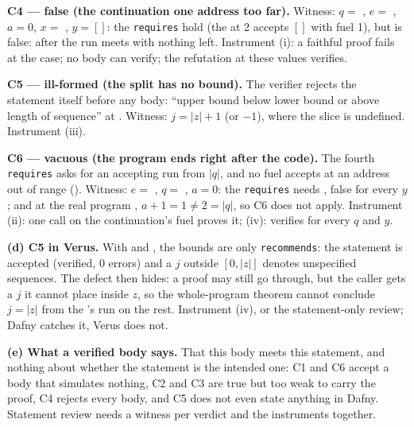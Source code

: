 \documentclass[11pt]{article}
\begin{document}
\begin{answer}
\textbf{C4 --- false (the continuation one address too far).} Witness: $q =$
, $e =$ , $a = 0$, $x =$
\dfy{['a']}, $y = []$: the \texttt{requires} hold (the  at 2
accepts $[]$ with fuel 1), but  is false: after
 the run meets  with nothing left. Instrument (i): a
faithful proof fails at the  case; no body can verify; the refutation
at these values verifies.

\textbf{C5 --- ill-formed (the split has no bound).} The verifier rejects the
statement itself before any body: ``upper bound below lower bound or above
length of sequence'' at . Witness: $j = |z| + 1$ (or $-1$), where
the slice is undefined. Instrument (iii).

\textbf{C6 --- vacuous (the program ends right after the code).} The fourth
\texttt{requires} asks for an accepting run from $|q|$, and no fuel accepts at
an address out of range (). Witness: $e =$ ,
$q =$ \dfy{[IChar('a')]}, $a = 0$: the \texttt{requires} needs
, false for every $y$; and at the real program
, $a + 1 = 1 \neq 2 = |q|$, so C6 does not apply.
Instrument (ii): one  call on the continuation's fuel proves
it; (iv):  verifies for every $q$ and $y$.

\textbf{(d) C5 in Verus.} With  and
, the bounds are only \texttt{recommends}:
the statement is accepted (verified, 0 errors) and a $j$ outside $[0, |z|]$
denotes unspecified sequences. The defect then hides: a proof may still go
through, but the caller gets a $j$ it cannot place inside $z$, so the
whole-program theorem cannot conclude $j = |z|$ from the 's run on
the rest. Instrument (iv), or the statement-only review; Dafny catches it,
Verus does not.

\textbf{(e) What a verified body says.} That this body meets this statement,
and nothing about whether the statement is the intended one: C1 and C6 accept a
body that simulates nothing, C2 and C3 are true but too weak to carry the
proof, C4 rejects every body, and C5 does not even state anything in Dafny.
Statement review needs a witness per verdict and the instruments together.
\end{answer}
\end{document}
